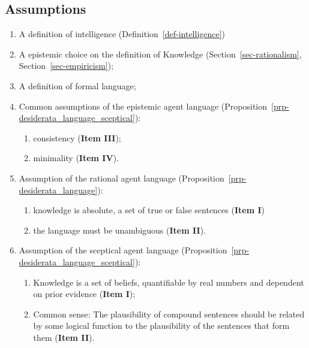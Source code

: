 \documentclass[
  letterpaper,
  12pt,
  british]{tufte-book}
\providecommand{\tightlist}{%
  \setlength{\itemsep}{0pt}\setlength{\parskip}{0pt}}\usepackage{longtable,booktabs,array}
\theoremstyle{plain}
\theoremstyle{plain}
\theoremstyle{definition}
\theoremstyle{remark}
\begin{document}
\hypertarget{assumptions-1}{%
\subsection{Assumptions}\label{assumptions-1}}

\begin{enumerate}
\def\labelenumi{\arabic{enumi}.}
\item
  A definition of intelligence (Definition~\ref{def-intelligence})
\item
  A epistemic choice on the definition of Knowledge
  (Section~\ref{sec-rationalism}, Section~\ref{sec-empiricism});
\item
  A definition of formal language;
\item
  Common assumptions of the epistemic agent language
  (Proposition~\ref{prp-desiderata_language_sceptical}):

  \begin{enumerate}
  \def\labelenumii{\arabic{enumii}.}
  \item
    consistency (\textbf{Item III});
  \item
    minimality (\textbf{Item IV}).
  \end{enumerate}
\item
  Assumption of the rational agent language
  (Proposition~\ref{prp-desiderata_language}):

  \begin{enumerate}
  \def\labelenumii{\roman{enumii}.}
  \tightlist
  \item
    knowledge is absolute, a set of true or false sentences
    (\textbf{Item I})
  \item
    the language must be unambiguous (\textbf{Item II}).
  \end{enumerate}
\item
  Assumption of the sceptical agent language
  (Proposition~\ref{prp-desiderata_language_sceptical}):

  \begin{enumerate}
  \def\labelenumii{\roman{enumii}.}
  \item
    Knowledge is a set of beliefs, quantifiable by real numbers and
    dependent on prior evidence (\textbf{Item I});
  \item
    Common sense: The plausibility of compound sentences should be
    related by some logical function to the plausibility of the
    sentences that form them (\textbf{Item II}).
  \end{enumerate}
\end{enumerate}
\end{document}
